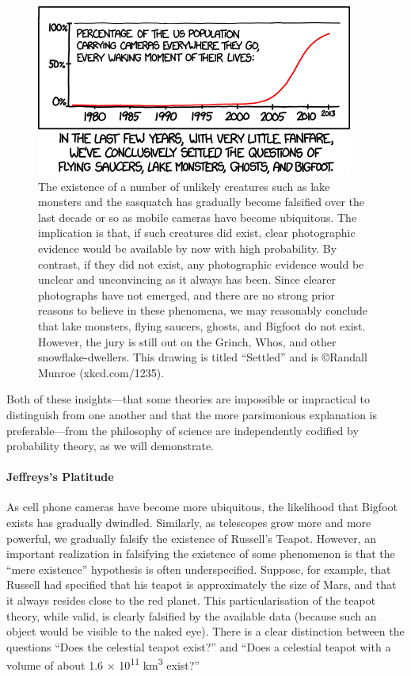 \begin{figure}[bt]
\includegraphics[width=.475\textwidth]{settled.png}
\caption{The existence of a number of unlikely creatures such as lake monsters and the sasquatch has gradually become falsified over the last decade or so as mobile cameras have become ubiquitous.  The implication is that, if such creatures did exist, clear photographic evidence would be available by now with high probability.  By contrast, if they did not exist, any photographic evidence would be unclear and unconvincing as it always has been. Since clearer photographs have not emerged, and there are no strong prior reasons to believe in these phenomena, we may reasonably conclude that lake monsters, flying saucers, ghosts, and Bigfoot do not exist. However, the jury is still out on the Grinch, Whos, and other snowflake-dwellers. This drawing is titled ``Settled'' and is \copyright Randall Munroe (xkcd.com/1235).
}\label{fig:xkcd}
\end{figure}

Both of these insights---that some theories are impossible or impractical to distinguish from one another and that the more parsimonious explanation is preferable---from the philosophy of science are independently codified by probability theory, as we will demonstrate.

\paragraph{Jeffreys's Platitude} As cell phone cameras have become more ubiquitous, the likelihood that Bigfoot exists has gradually dwindled.  Similarly, as telescopes grow more and more powerful, we gradually falsify the existence of Russell's Teapot.  However, an important realization in falsifying the existence of some phenomenon is that the ``mere existence'' hypothesis is often underspecified.  Suppose, for example, that Russell had specified that his teapot is approximately the size of Mars, and that it always resides close to the red planet.  This particularisation of the teapot theory, while valid, is clearly falsified by the available data (because such an object would be visible to the naked eye).  There is a clear distinction between the questions ``Does the celestial teapot exist?'' and ``Does a celestial teapot with a volume of about 1.6 $\times$ 10\textsuperscript{11} km\textsuperscript{3} exist?''

